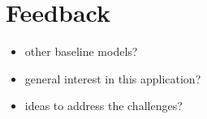 \documentclass[a0]{tumposter}
\begin{document}
\begin{minipage}[t]{0.32\textwidth}
\begin{minipage}{\textwidth}
	 \end{minipage}
	 
	 \section{Feedback}
	 
	 \begin{itemize}
	 	\item other baseline models?
	 	\item general interest in this application?
	 	\item ideas to address the challenges?
	 \end{itemize}

	\tiny
	
	

\end{minipage}
\end{document}
